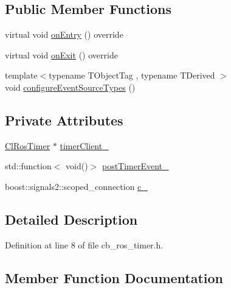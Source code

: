 \subsection*{Public Member Functions}
\begin{DoxyCompactItemize}
\item 
virtual void \hyperlink{classros__timer__client_1_1CbTimer_a25c086b5988642602938d92f9555ce18}{on\+Entry} () override
\item 
virtual void \hyperlink{classros__timer__client_1_1CbTimer_a27d62ebacf667d4c2518c0416ee7b25b}{on\+Exit} () override
\item 
{\footnotesize template$<$typename T\+Object\+Tag , typename T\+Derived $>$ }\\void \hyperlink{classros__timer__client_1_1CbTimer_a11226b0050d363187aa1bfe3e9c672af}{configure\+Event\+Source\+Types} ()
\end{DoxyCompactItemize}
\subsection*{Private Attributes}
\begin{DoxyCompactItemize}
\item 
\hyperlink{classros__timer__client_1_1ClRosTimer}{Cl\+Ros\+Timer} $\ast$ \hyperlink{classros__timer__client_1_1CbTimer_a370d115a7423db45ca375673db8a4ed1}{timer\+Client\+\_\+}
\item 
std\+::function$<$ void()$>$ \hyperlink{classros__timer__client_1_1CbTimer_a7e15bf1451d17c96aba814dc3e5c08e9}{post\+Timer\+Event\+\_\+}
\item 
boost\+::signals2\+::scoped\+\_\+connection \hyperlink{classros__timer__client_1_1CbTimer_a755a7f5d8662ae3b7507da0fe82e5b22}{c\+\_\+}
\end{DoxyCompactItemize}


\subsection{Detailed Description}


Definition at line 8 of file cb\+\_\+ros\+\_\+timer.\+h.



\subsection{Member Function Documentation}
